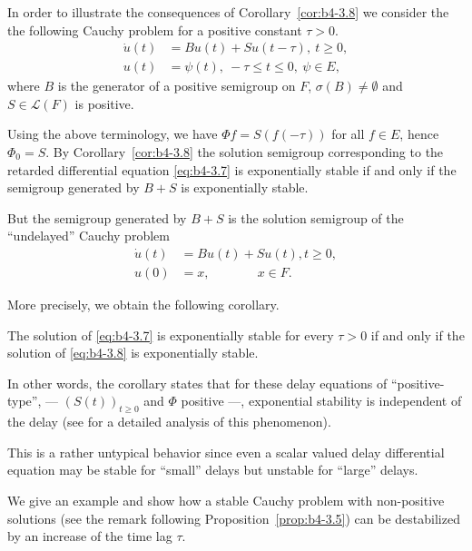 \begin{example}\label{ex:b4-3.10}
	In order to illustrate the consequences of Corollary~\ref{cor:b4-3.8} we consider the the following Cauchy problem for a positive constant  $\tau > 0$.
	\begin{equation}\label{eq:b4-3.7}
		\begin{aligned}
		\dot{u}(t) &= Bu(t) + Su(t-\tau) , \  t \geq 0 ,\\
		u(t) &= \psi(t) , \  -\tau \leq t \leq 0  , \ \psi \in E ,
		\end{aligned}
	\end{equation}
	where $B$ is the generator of a positive semigroup on $F$, $\sigma(B) \neq \emptyset$ and $S \in \mathcal{L}(F)$ is positive.
	
	Using the above terminology, we have $\Phi f = S(f(-\tau))$ for all $f \in E$, hence $\Phi_{0} = S$. 
	By Corollary~\ref{cor:b4-3.8} the solution semigroup corresponding to the retarded differential equation \eqref{eq:b4-3.7} is exponentially stable if and only if the semigroup generated by $B + S$ is exponentially stable.
	
	But the semigroup generated by $B + S$ is the solution semigroup of the \enquote{undelayed} Cauchy problem
	\begin{equation}\label{eq:b4-3.8}
	\begin{aligned}
		\dot{u}(t) &= Bu(t) + Su(t) , t \geq 0 ,\\
		u(0) &= x , \quad\quad\quad\;\;\, x \in F.
	\end{aligned}
	\end{equation}
\end{example}
More precisely, we obtain the following corollary.
\begin{corollary*}
    The solution of \eqref{eq:b4-3.7} is exponentially stable for every $\tau > 0$ if and only if the solution of \eqref{eq:b4-3.8} is exponentially stable.
\end{corollary*}
In other words, the corollary states that for these delay equations of \enquote{positive-type}, 
--- $(S(t))_{t\geq0}$ and $\Phi$ positive ---, 
exponential stability is independent of the delay (see \citet{kerscher:1986} for a detailed analysis of this phenomenon).
	
This is a rather untypical behavior since even a scalar valued delay differential equation may be stable for \enquote{small} delays but unstable for \enquote{large} delays.
	
We give an example and show how a stable Cauchy problem with non-positive solutions (see the remark following Proposition~\ref{prop:b4-3.5}) can be destabilized by an increase of the time lag $\tau$.
	
